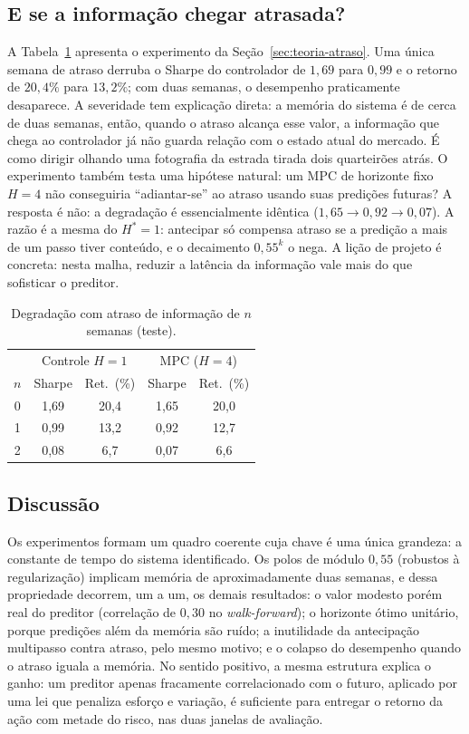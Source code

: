 \documentclass[conference]{IEEEtran}
\begin{document}
\subsection{E se a informação chegar atrasada?}\label{sec:res-atraso}

A Tabela~\ref{tab:atraso} apresenta o experimento da Seção~\ref{sec:teoria-atraso}. Uma única semana de atraso derruba o Sharpe do controlador de $1{,}69$ para $0{,}99$ e o retorno de $20{,}4\%$ para $13{,}2\%$; com duas semanas, o desempenho praticamente desaparece. A severidade tem explicação direta: a memória do sistema é de cerca de duas semanas, então, quando o atraso alcança esse valor, a informação que chega ao controlador já não guarda relação com o estado atual do mercado. É como dirigir olhando uma fotografia da estrada tirada dois quarteirões atrás. O experimento também testa uma hipótese natural: um MPC de horizonte fixo $H=4$ não conseguiria ``adiantar-se'' ao atraso usando suas predições futuras? A resposta é não: a degradação é essencialmente idêntica ($1{,}65 \to 0{,}92 \to 0{,}07$). A razão é a mesma do $H^{*}=1$: antecipar só compensa atraso se a predição a mais de um passo tiver conteúdo, e o decaimento $0{,}55^k$ o nega. A lição de projeto é concreta: nesta malha, reduzir a latência da informação vale mais do que sofisticar o preditor.

\begin{table}[!t]
\centering
\caption{Degradação com atraso de informação de $n$ semanas (teste).}
\label{tab:atraso}
\begin{tabular}{ccccc}
\toprule
 & \multicolumn{2}{c}{Controle $H{=}1$} & \multicolumn{2}{c}{MPC ($H{=}4$)} \\
$n$ & Sharpe & Ret.\ (\%) & Sharpe & Ret.\ (\%) \\
\midrule
0 & 1,69 & 20,4 & 1,65 & 20,0 \\
1 & 0,99 & 13,2 & 0,92 & 12,7 \\
2 & 0,08 & \phantom{0}6,7 & 0,07 & \phantom{0}6,6 \\
\bottomrule
\end{tabular}
\end{table}

\subsection{Discussão}

Os experimentos formam um quadro coerente cuja chave é uma única grandeza: a constante de tempo do sistema identificado. Os polos de módulo $0{,}55$ (robustos à regularização) implicam memória de aproximadamente duas semanas, e dessa propriedade decorrem, um a um, os demais resultados: o valor modesto porém real do preditor (correlação de $0{,}30$ no \emph{walk-forward}); o horizonte ótimo unitário, porque predições além da memória são ruído; a inutilidade da antecipação multipasso contra atraso, pelo mesmo motivo; e o colapso do desempenho quando o atraso iguala a memória. No sentido positivo, a mesma estrutura explica o ganho: um preditor apenas fracamente correlacionado com o futuro, aplicado por uma lei que penaliza esforço e variação, é suficiente para entregar o retorno da ação com metade do risco, nas duas janelas de avaliação.
\end{document}
